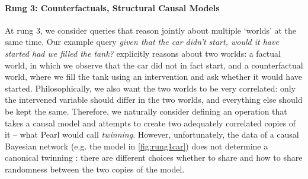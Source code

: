 \documentclass[11pt,a4paper]{article}
\begin{document}
\paragraph{Rung 3: Counterfactuals, Structural Causal Models} At rung 3, we consider queries that reason jointly about multiple `worlds' at the same time. Our example query \emph{given that the car didn't start, would it have started had we filled the tank?} explicitly reasons about two worlds: a factual world, in which we observe that the car did not in fact start, and a counterfactual world, where we fill the tank using an intervention and ask whether it would have started. Philosophically, we also want the two worlds to be very correlated: only the intervened variable should differ in the two worlds, and everything else should be kept the same. Therefore, we naturally consider defining an operation that takes a causal model and attempts to create two adequately correlated copies of it -- what Pearl would call \emph{twinning}. However, unfortunately, the data of a causal Bayesian network (e.g. the model in \cref{fig:rung1car}) does not determine a canonical twinning \cite{Balke1994}: there are different choices whether to share and how to share randomness between the two copies of the model. 
\end{document}
